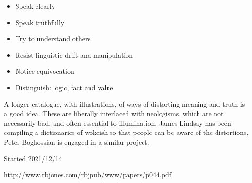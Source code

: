 \documentclass[10pt,titlepage]{article}
\begin{document}
\begin{itemize}
\item Speak clearly
  
\item Speak truthfully
  
\item Try to understand others
  
\item Resist linguistic drift and manipulation
  
\item Notice equivocation

\item Distinguish: logic, fact and value
\end{itemize}

A longer catalogue, with illustrations, of ways of distorting meaning and truth is a good idea.
These are liberally interlaced with neologisms, which are not necessarily bad, and often essential to illumination.
James Lindsay \cite{lindsay-translations} has been compiling a dictionaries of wokeish so that people can be aware of the distortions, Peter Boghossian is engaged in a similar project.


{}





\tiny{
Started 2021/12/14


\href{http://www.rbjones.com/rbjpub/www/papers/p044.pdf}{http://www.rbjones.com/rbjpub/www/papers/p044.pdf}

}%
\end{document}
